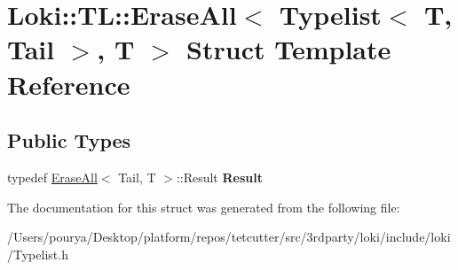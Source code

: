 \hypertarget{structLoki_1_1TL_1_1EraseAll_3_01Typelist_3_01T_00_01Tail_01_4_00_01T_01_4}{}\section{Loki\+:\+:T\+L\+:\+:Erase\+All$<$ Typelist$<$ T, Tail $>$, T $>$ Struct Template Reference}
\label{structLoki_1_1TL_1_1EraseAll_3_01Typelist_3_01T_00_01Tail_01_4_00_01T_01_4}
\subsection*{Public Types}
\begin{DoxyCompactItemize}
\item 
\hypertarget{structLoki_1_1TL_1_1EraseAll_3_01Typelist_3_01T_00_01Tail_01_4_00_01T_01_4_a57bd5b0d762b56225455d1fd330d2ebe}{}typedef \hyperlink{structLoki_1_1TL_1_1EraseAll}{Erase\+All}$<$ Tail, T $>$\+::Result {\bfseries Result}\label{structLoki_1_1TL_1_1EraseAll_3_01Typelist_3_01T_00_01Tail_01_4_00_01T_01_4_a57bd5b0d762b56225455d1fd330d2ebe}

\end{DoxyCompactItemize}


The documentation for this struct was generated from the following file\+:\begin{DoxyCompactItemize}
\item 
/\+Users/pourya/\+Desktop/platform/repos/tetcutter/src/3rdparty/loki/include/loki/Typelist.\+h\end{DoxyCompactItemize}
